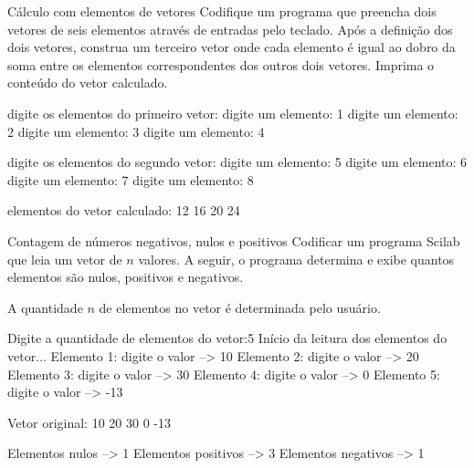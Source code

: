 \documentclass[11pt]{practice}
\begin{document}
\begin{task}{Cálculo com elementos de vetores}{}
  Codifique um programa que preencha dois vetores de seis elementos
  através de entradas pelo teclado. Após a definição dos dois vetores,
  construa um terceiro vetor onde cada elemento é igual ao dobro da soma
  entre os elementos correspondentes dos outros dois vetores. Imprima o
  conteúdo do vetor calculado.

  \begin{runexample}
digite os elementos do primeiro vetor:
digite um elemento: 1
digite um elemento: 2
digite um elemento: 3
digite um elemento: 4

digite os elementos do segundo vetor:
digite um elemento: 5
digite um elemento: 6
digite um elemento: 7
digite um elemento: 8

elementos do vetor calculado:
12 16 20 24
  \end{runexample}

  \tcblower
  \solution
\end{task}

\begin{task}{Contagem de números negativos, nulos e positivos}{}
  Codificar um programa Scilab que leia um vetor de $n$ valores. A
  seguir, o programa determina e exibe quantos elementos são nulos,
  positivos e negativos.

  A quantidade $n$ de elementos no vetor é determinada pelo usuário.
  \begin{runexample}
Digite a quantidade de elementos do vetor:5
Início da leitura dos elementos do vetor...
Elemento 1: 
  digite o valor --> 10
Elemento 2: 
  digite o valor --> 20
Elemento 3: 
  digite o valor --> 30
Elemento 4: 
  digite o valor --> 0
Elemento 5: 
  digite o valor --> -13

Vetor original:
10  20  30  0  -13  

Elementos nulos     --> 1
Elementos positivos --> 3
Elementos negativos --> 1
  \end{runexample}

  \tcblower
  \solution
\end{task}
\end{document}
